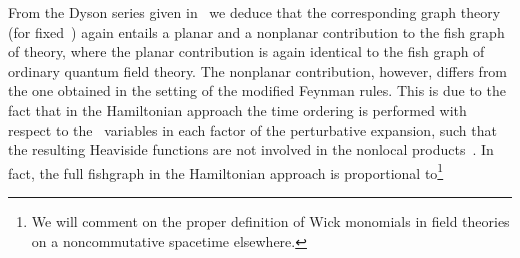 \documentclass[a4paper,twoside,12pt]{article}
\begin{document}
From the Dyson series given in~\cite{dfr} we deduce that the corresponding
graph theory (for fixed~\myHighlight{$\sigma$}\coordHE{}) again entails a planar and a nonplanar
contribution to the fish graph of \coordHE{} theory, where the planar
contribution is again identical to the fish graph of ordinary quantum field
theory. The nonplanar contribution, however, differs from the one obtained in
the setting of the modified Feynman rules. This is due to the fact that in the
Hamiltonian approach the time ordering is performed with respect to the 
\coordHE{}~variables in each factor \coordHE{} of the perturbative expansion, such that the
resulting Heaviside functions are not involved in the nonlocal 
products~\cite[eqn. 6.15]{dfr}.  In fact, the full fishgraph in the Hamiltonian
approach is proportional to\footnote{We will comment on the proper definition
of Wick monomials in field theories on a noncommutative spacetime elsewhere.} 
\end{document}
